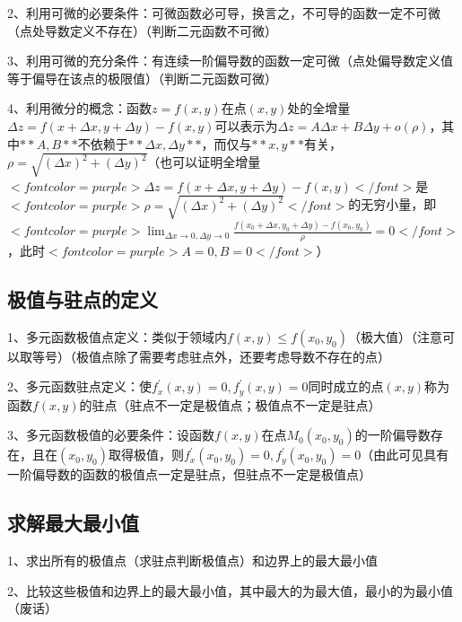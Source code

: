 2、利用可微的必要条件：可微函数必可导，换言之，不可导的函数一定不可微（点处导数定义不存在）（判断二元函数不可微）

3、利用可微的充分条件：有连续一阶偏导数的函数一定可微（点处偏导数定义值等于偏导在该点的极限值）（判断二元函数可微）

4、利用微分的概念：函数$ z=f(x, y) $在点$ (x, y) $处的全增量$ \Delta z=f(x+\Delta x, y+\Delta y)-f(x, y) $可以表示为$ \Delta z=A \Delta x+B \Delta y+o(\rho) $，其中$ **A,B** $不依赖于$ **\Delta x, \Delta y** $，而仅与$ **x, y** $有关，$ \rho=\sqrt{(\Delta x)^{2}+(\Delta y)^{2}} $（也可以证明全增量$ <font color=purple>\Delta z=f(x+\Delta x, y+\Delta y)-f(x, y)</font> $是$ <font color=purple>\rho=\sqrt{(\Delta x)^{2}+(\Delta y)^{2}}</font> $的无穷小量，即$ <font color=purple>\lim_{\Delta x \rightarrow 0,\Delta y \rightarrow 0}\frac{f\left(x_{0}+\Delta x, y_{0}+\Delta y\right)-f\left(x_{0}, y_{0}\right)}{\rho}=0</font> $，此时$ <font color=purple>A=0,B=0</font> $）



\subsection{极值与驻点的定义}

1、多元函数极值点定义：类似于领域内$ f(x, y) \leqslant f\left(x_{0}, y_{0}\right) $（极大值）（注意可以取等号）（极值点除了需要考虑驻点外，还要考虑导数不存在的点）

2、多元函数驻点定义：使$ f_{x}^{\prime}(x, y)=0, f_{y}^{\prime}(x, y)=0 $同时成立的点$ (x, y) $称为函数$ f(x, y) $的驻点（驻点不一定是极值点；极值点不一定是驻点）

3、多元函数极值的必要条件：设函数$ f(x, y) $在点$ M_{0}\left(x_{0}, y_{0}\right) $的一阶偏导数存在，且在$ \left(x_{0}, y_{0}\right) $取得极值，则$ f_{x}^{\prime}\left(x_{0}, y_{0}\right)=0, f_{y}^{\prime}\left(x_{0}, y_{0}\right)=0 $（由此可见具有一阶偏导数的函数的极值点一定是驻点，但驻点不一定是极值点）



\subsection{求解最大最小值}

1、求出所有的极值点（求驻点判断极值点）和边界上的最大最小值

2、比较这些极值和边界上的最大最小值，其中最大的为最大值，最小的为最小值（废话）

